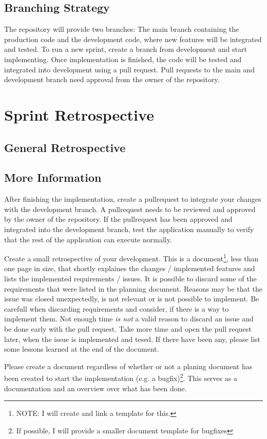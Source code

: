 \subsection{Branching Strategy}\label{sec:branching_strategy}
The repository will provide two branches: The main branch containing the production code and the development code, where new
features will be integrated and tested. To run a new sprint, create a branch from development and start implementing. Once 
implementation is finished, the code will be tested and integrated into development using a pull request. Pull requests to the
main and development branch need approval from the owner of the repository.

\section{Sprint Retrospective}\label{sec:retrospective}
\subsection{General Retrospective}\label{sec:general_retrospective}
\subsection{More Information}\label{sec:more_information}
After finishing the implementation, create a pullrequest to integrate your changes with the development branch. A pullrequest 
needs to be reviewed and approved by the owner of the repository. If the pullrequest has been approved and integrated into the
development branch, test the application manually to verify that the rest of the application can execute normally.

Create a small retrospective of your development. This is a document\footnote{NOTE: I will create and link a template for this.},
less than one page in size, that shortly explaines the changes / implemented features and lists the implemented requirements /
issues. It is possible to discard some of the requirements that were listed in the planning document. Reasons may be that the
issue was closed unexpectedly, is not relevant or is not possible to implement. Be carefull when discarding requirements and 
consider, if there is a way to implement them. Not enough time \emph{is not} a valid reason to discard an issue and be done
early with the pull request. Take more time and open the pull request later, when the issue is implemented and tesed. If there
have been any, please list some lessons learned at the end of the document.

Please create a document regardless of whether or not a planing document has been created to start the implementation (e.g. a
bugfix)\footnote{If possible, I will provide a smaller document template for bugfixes}. This serves as a documentation and an
overview over what has been done.
